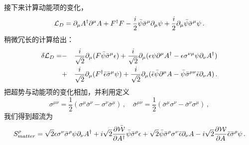 接下来计算动能项的变化，
$$
{\cal L}_{D} = \partial_\mu A^\dagger \partial^\mu A +
F^\dagger F-\frac{i}{2}\bar{\psi} \bar{\sigma}^\mu\partial_\mu\psi+
\frac{i}{2}\partial_\mu\bar{\psi}\bar{\sigma}^\mu\psi\,.
$$
稍微冗长的计算给出：
\begin{eqnarray}
\delta {\cal L}_{D}=&-&\frac{i}{\sqrt{2}}\partial_\mu (F\bar{\psi}
\bar{\sigma}^\mu \epsilon ) +
\frac{i}{\sqrt{2}} \partial_\mu (\epsilon\psi\partial^\mu A^\dagger - 
\epsilon \sigma^{\nu\mu}\psi \partial_\nu A^\dagger)\nonumber \\
&+& \frac{i}{\sqrt{2}}\partial_\mu (F^\dagger \bar{\epsilon}
\bar{\sigma}^\mu\psi)+\frac{i}{\sqrt{2}}\partial_\mu (\bar{\epsilon} 
\bar{\psi}\partial^\mu A-\bar{\psi}\bar{\sigma}^{\mu\nu}\bar{\epsilon}
\partial_\nu A )\,.\nonumber
\end{eqnarray}
把超势与动能项的变化相加，并利用定义
$$
\sigma^{\mu\nu}=\frac{1}{2} (\sigma^\mu \bar{\sigma}^\nu -
\sigma^\nu \bar{\sigma}^\mu )\,,\quad
\bar{\sigma}^{\mu\nu} = \frac{1}{2} (\bar{\sigma}^\mu \sigma^\nu
- \bar{\sigma}^\nu \sigma^\mu ) \,,
$$
我们得到超流为
\begin{equation}
S^\rho_{matter}=\sqrt{2}\epsilon \sigma^\nu\bar{\sigma}^\rho \psi
\partial_\nu A^\dagger + i \sqrt{2}\frac{\partial\bar{{\cal W}}}
{\partial A^\dagger}\bar{\psi}\bar{\sigma}^\rho\epsilon
+ \sqrt{2}\bar{\psi} \bar{\sigma}^\rho\sigma^\nu\bar{\epsilon}
\partial_\nu A - i\sqrt{2}\frac{\partial {\cal W}}{\partial A} 
\bar{\epsilon} \bar{\sigma}^\rho \psi\,. 
\label{N=1scch}
\end{equation}
